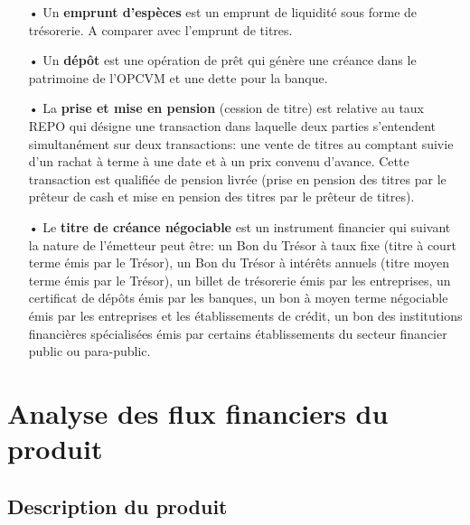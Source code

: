 \documentclass[french,12pt,a4paper]{article}
\begin{document}
\begin{itemize}
\item[•]
Un \textbf{emprunt d'espèces} est un emprunt de liquidité sous forme de trésorerie. A comparer avec l'emprunt de titres.\\

\item[•]
Un \textbf{dépôt} est une opération de prêt qui génère une créance dans le patrimoine de l'OPCVM et une dette pour la banque. \\

\item[•]
La \textbf{prise et mise en pension} (cession de titre) est relative au taux REPO qui désigne une transaction dans laquelle deux parties s'entendent simultanément sur deux transactions: une vente de titres au comptant suivie d'un rachat à terme à une date et à un prix convenu d'avance. Cette transaction est qualifiée de pension livrée (prise en pension des titres par le prêteur de cash et mise en pension des titres par le prêteur de titres).\\

\item[•]
Le \textbf{titre de créance négociable} est un instrument financier qui suivant la nature de l'émetteur peut être: un Bon du Trésor à taux fixe (titre à court terme émis par le Trésor), un Bon du Trésor à intérêts annuels (titre moyen terme émis par le Trésor), un billet de trésorerie émis par les entreprises, un certificat de dépôts émis par les banques, un bon à moyen terme négociable émis par les entreprises et les établissements de crédit, un bon des institutions financières spécialisées émis par certains établissements du secteur financier public ou para-public.\\

\end{itemize}

\newpage
\section{Analyse des flux financiers du produit}

\subsection{Description du produit}
\end{document}
